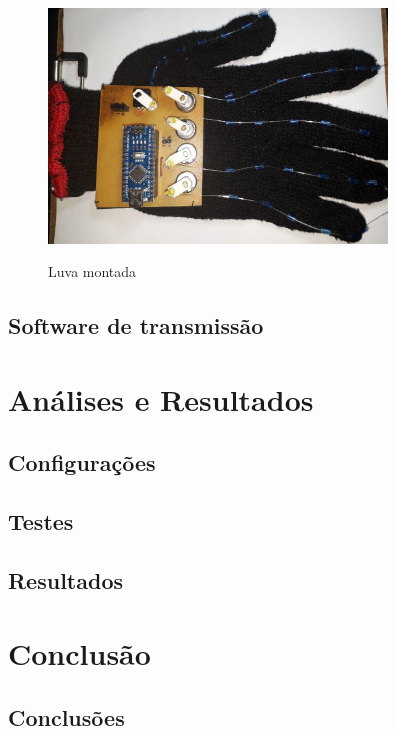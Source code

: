 \documentclass[
	12pt,				%
	openright,			%
	oneside,			%
	a4paper,			%
	english,			%
	brazil				%
	]{abntex2}
\begin{document}
		\begin{figure}[h!]
			\centering
			\caption{Luva montada}
  		\includegraphics[width=9cm]{figures/glove-ready1.jpg}
  		\label{Fig:glove-ready1}
		\end{figure}


		\section{Software de transmissão}



	
	\chapter{Análises e Resultados}

		\section{Configurações}

		\section{Testes}

		\section{Resultados}
		

  \chapter{Conclusão}

		\section{Conclusões}
\end{document}

